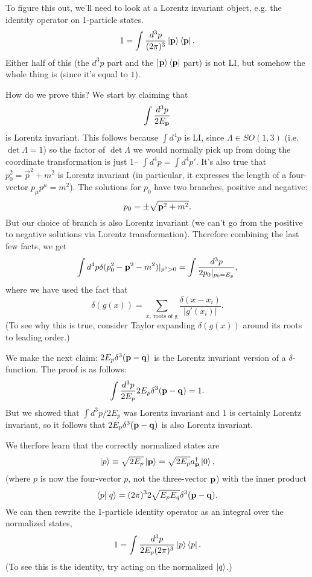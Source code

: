 To figure this out, we'll need to look at a Lorentz invariant object, e.g. the identity operator on 1-particle states.
$$1=\int \frac{d^3p}{(2\pi)^3} \left| \boldsymbol{\mathbf{p}} \right>\left< \boldsymbol{\mathbf{p}} \right|.$$
Either half of this (the $d^3p$ part and the $\left| \boldsymbol{\mathbf{p}} \right>\left< \boldsymbol{\mathbf{p}} \right|$ part) is not LI, but somehow the whole thing is (since it's equal to $1$).

How do we prove this? We start by claiming that
$$\int \frac{d^3p}{2E_{\boldsymbol{\mathbf{p}}}}$$ is Lorentz invariant. This follows because $\int d^4p$ is LI, since $\Lambda \in SO(1,3)$ (i.e. $\det \Lambda=1$) so the factor of $\det \Lambda$ we would normally pick up from doing the coordinate transformation is just 1-- $\int d^4p = \int d^4 p'$. It's also true that $p_0^2= \vec{p}^2+m^2$ is Lorentz invariant (in particular, it expresses the length of a four-vector $p_\mu p^\mu = m^2$). The solutions for $p_0$ have two branches, positive and negative:
$$p_0 = \pm \sqrt{\boldsymbol{\mathbf{p}}^2+m^2}.$$
But our choice of branch is also Lorentz invariant (we can't go from the positive to negative solutions via Lorentz transformation). Therefore combining the last few facts, we get
$$\int d^4 p \delta(p_0^2-\boldsymbol{\mathbf{p}}^2-m^2)|_{p^0 >0} = \int \frac{d^3 p}{2p_0|_{p_0=E_p}},$$
where we have used the fact that $$\delta(g(x))=\sum_{x_i\text{ roots of g}} \frac{\delta(x-x_i)}{|g'(x_i)|}.$$
(To see why this is true, consider Taylor expanding $\delta(g(x))$ around its roots to leading order.)

We make the next claim: $2E_p \delta^3(\boldsymbol{\mathbf{p}} - \boldsymbol{\mathbf{q}})$ is the Lorentz invariant version of a $\delta$-function. The proof is as follows:
$$\int \frac{d^3 p}{2E_p} 2E_p \delta^3(\boldsymbol{\mathbf{p}} - \boldsymbol{\mathbf{q}})=1.$$
But we showed that $\int d^3p/2E_p$ was Lorentz invariant and 1 is certainly Lorentz invariant, so it follows that $2E_p\delta^3(\boldsymbol{\mathbf{p}}-\boldsymbol{\mathbf{q}})$ is also Lorentz invariant.

We therfore learn that the correctly normalized states are
$$\left| p \right>\equiv \sqrt{2E_p}\left| \boldsymbol{\mathbf{p}} \right> = \sqrt{2 E_p}a_{\boldsymbol{\mathbf{p}}}^\dagger \left| 0 \right>,$$
(where $p$ is now the four-vector $p$, not the three-vector $\boldsymbol{\mathbf{p}}$) with the inner product
$$\braket{p}{q}=(2\pi)^3 2\sqrt{E_p E_q} \delta^3(\pv - \vec q).$$
We can then rewrite the 1-particle identity operator as an integral over the normalized states,
$$1=\int \frac{d^3p}{2E_p(2\pi)^3} \left| p \right>\left< p \right|.$$
(To see this is the identity, try acting on the normalized $\left| q \right>$.)

